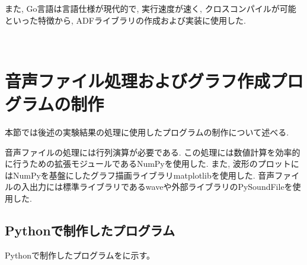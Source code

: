 また, Go言語は言語仕様が現代的で, 実行速度が速く, クロスコンパイルが可能といった特徴から, ADFライブラリの作成および実装に使用した. 



\newpage

\
\section{音声ファイル処理およびグラフ作成プログラムの制作}\label{create-program}

本節では後述の実験結果の処理に使用したプログラムの制作について述べる. 

音声ファイルの処理には行列演算が必要である. この処理には数値計算を効率的に行うための拡張モジュールであるNumPyを使用した. また, 波形のプロットにはNumPyを基盤にしたグラフ描画ライブラリmatplotlibを使用した. 
音声ファイルの入出力には標準ライブラリであるwaveや外部ライブラリのPySoundFileを使用した. 


\subsection{Pythonで制作したプログラム}\label{python}

Pythonで制作したプログラムをに示す。

